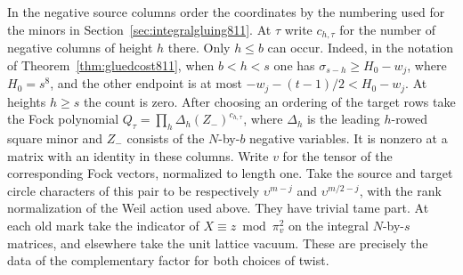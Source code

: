 \documentclass[a4paper,11pt]{article}
\theoremstyle{definition}
\theoremstyle{remark}
\numberwithin{equation}{section}
\begin{document}
In the negative source columns order the coordinates by the
numbering used for the minors in Section~\ref{sec:integralgluing811}.
At \(\tau\) write \(c_{h,\tau}\) for the number of negative
columns of height \(h\) there. Only \(h\le b\) can occur.
Indeed, in the notation of Theorem~\ref{thm:gluedcost811},
when \(b<h<s\) one has \(\sigma_{s-h}\ge H_0-w_j\), where
\(H_0=s^8\), and the other endpoint is at most
\(-w_j-(t-1)/2<H_0-w_j\). At heights \(h\ge s\) the count is
zero. After choosing an ordering of the target rows take the
Fock polynomial \(Q_\tau=\prod_h\Delta_h(Z_-)^{c_{h,\tau}}\),
where \(\Delta_h\) is the leading \(h\)-rowed square minor and
\(Z_-\) consists of the \(N\)-by-\(b\) negative variables.
It is nonzero at a matrix with an identity in these columns.
Write \(v\) for the tensor of the corresponding Fock vectors,
normalized to length one. Take the source and target circle
characters of this pair to be respectively \(\upsilon^{m-j}\)
and \(\upsilon^{m/2-j}\), with the rank normalization of the
Weil action used above. They have trivial tame part. At each
old mark take the indicator of \(X\equiv z\bmod\pi_v^2\)
on the integral \(N\)-by-\(s\) matrices, and elsewhere take
the unit lattice vacuum. These are precisely the data of
the complementary factor for both choices of twist.
\end{document}
